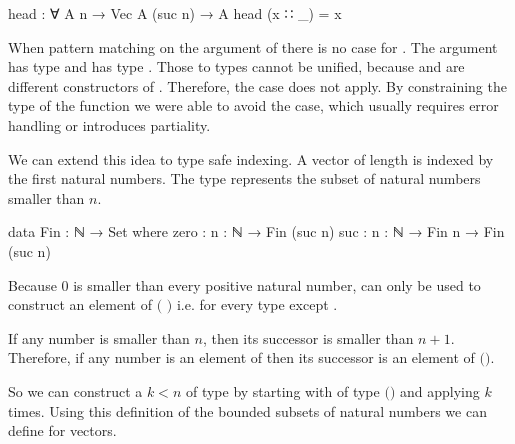 \documentclass[10pt,a4paper,twoside]{report}
\begin{document}
\begin{code}
head : ∀ {A n} → Vec A (suc n) → A
head (x ∷ _) = x
\end{code}
When pattern matching on the argument of  there is no case
for \AgdaInductiveConstructor{[]}.
The argument has type  and
\AgdaInductiveConstructor{[]} has type .
Those to types cannot be unified, because  and
 are different constructors of .
Therefore, the \AgdaInductiveConstructor{[]} case does not apply.
By constraining the type of the function we were able to avoid the case, which
usually requires error handling or introduces partiality.

We can extend this idea to type safe indexing.
A vector of length  is indexed by the first 
natural numbers.
The type \AgdaSpace{} represents the subset of
natural numbers smaller than $n$.

\begin{code}
data Fin : ℕ → Set where
  zero  : {n : ℕ} → Fin (suc n)
  suc   : {n : ℕ} → Fin n → Fin (suc n)
\end{code}
Because $0$ is smaller than every positive natural number,
 can only be used to construct an element of
\AgdaSpace{}$($
$)$ i.e. for every type except
\AgdaSpace{}.

If any number is smaller than $n$, then its successor is smaller than $n+1$.
Therefore, if any number is an element of
\AgdaSpace{}
then its successor is an element of
\AgdaSpace{}$($\AgdaSpace{}$)$.

So we can construct a $k<n$ of type
\AgdaSpace{} by starting with
 of type
\AgdaSpace{}$($$)$ and applying
 $k$ times.
Using this definition of the bounded subsets of natural numbers we can define
\AgdaFunction{\_!\_} for vectors.
\end{document}
